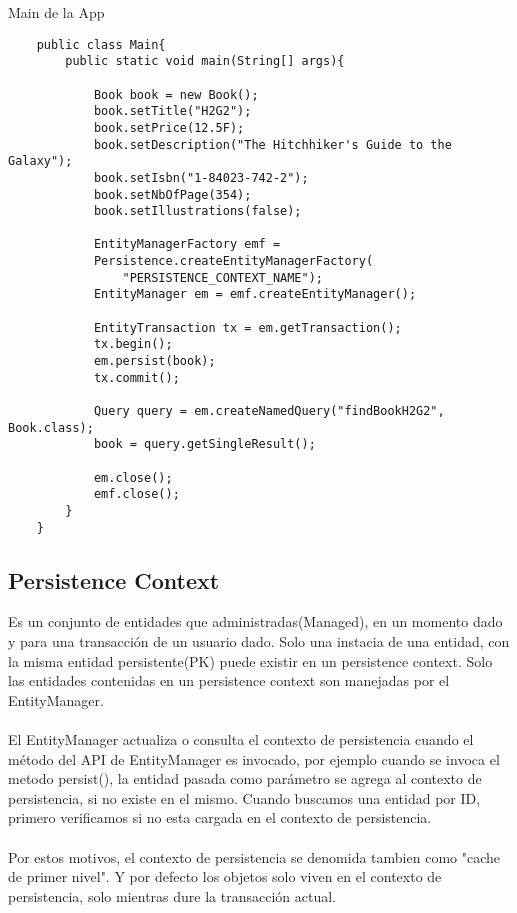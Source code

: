 \documentclass{article}
\begin{document}
Main de la App
\begin{lstlisting}
    public class Main{
        public static void main(String[] args){
                
            Book book = new Book();
            book.setTitle("H2G2");
            book.setPrice(12.5F);
            book.setDescription("The Hitchhiker's Guide to the Galaxy");
            book.setIsbn("1-84023-742-2");
            book.setNbOfPage(354);
            book.setIllustrations(false);

            EntityManagerFactory emf =  
            Persistence.createEntityManagerFactory(
                "PERSISTENCE_CONTEXT_NAME");
            EntityManager em = emf.createEntityManager();
                    
            EntityTransaction tx = em.getTransaction();
            tx.begin();
            em.persist(book);
            tx.commit();

            Query query = em.createNamedQuery("findBookH2G2", Book.class);
            book = query.getSingleResult();
                    
            em.close();
            emf.close();
        }
    }
\end{lstlisting}

\subsection*{Persistence Context}
Es un conjunto de entidades que administradas(Managed), en un momento dado y para una transacción de un usuario dado. Solo una instacia de una entidad,
con la misma entidad persistente(PK) puede existir en un persistence context. Solo las entidades contenidas en un persistence context son manejadas por
el EntityManager. \\\\
El EntityManager actualiza o consulta el contexto de persistencia cuando el método del API de EntityManager es invocado, por ejemplo cuando se invoca el
metodo persist(), la entidad pasada como parámetro se agrega al contexto de persistencia, si no existe en el mismo. Cuando buscamos una entidad por ID, primero verificamos
si no esta cargada en el contexto de persistencia. \\\\
Por estos motivos, el contexto de persistencia se denomida tambien como "cache de primer nivel". Y por defecto los objetos solo viven en el contexto de persistencia,
solo mientras dure la transacción actual. \\\\
\end{document}
